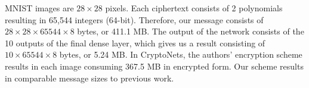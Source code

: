\documentclass[conference]{IEEEtran}
\begin{document}
MNIST images are $28 \times 28$ pixels.
Each ciphertext consists of 2 polynomials resulting in 65,544 integers (64-bit). 
Therefore, our message consists of $28 \times 28 \times 65544 \times 8$ bytes, or 411.1 MB. The output of the network consists of the 10 outputs of the final dense layer, which gives us a result consisting of $10 \times 65544 \times 8$ bytes, or 5.24 MB. In CryptoNets, the authors' encryption scheme results in each image consuming 367.5 MB in encrypted form.
Our scheme results in comparable message sizes to previous work.








\end{document}
